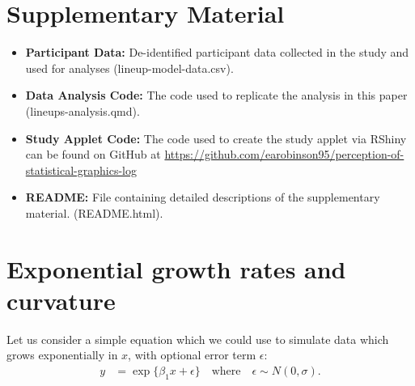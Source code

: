 \documentclass[12pt]{article}
\providecommand{\tightlist}{%
  \setlength{\itemsep}{0pt}\setlength{\parskip}{0pt}}
\begin{document}
\hypertarget{supplementary-material}{%
\section*{Supplementary Material}\label{supplementary-material}}

\begin{itemize}
\tightlist
\item
  \textbf{Participant Data:} De-identified participant data collected in
  the study and used for analyses (lineup-model-data.csv).
\item
  \textbf{Data Analysis Code:} The code used to replicate the analysis
  in this paper (lineups-analysis.qmd).
\item
  \textbf{Study Applet Code:} The code used to create the study applet
  via RShiny can be found on GitHub at
  \url{https://github.com/earobinson95/perception-of-statistical-graphics-log}
\item
  \textbf{README:} File containing detailed descriptions of the
  supplementary material. (README.html).
\end{itemize}

\newpage
{} %

\renewcommand{\thesection}{A}
\setcounter{figure}{0}    
\renewcommand\thefigure{\thesection\arabic{figure}}  
\setcounter{equation}{0}    
\renewcommand\theequation{\thesection\arabic{equation}}

\hypertarget{exponential-growth-rates-and-curvature}{%
\section{Exponential growth rates and
curvature}\label{exponential-growth-rates-and-curvature}}

Let us consider a simple equation which we could use to simulate data
which grows exponentially in \(x\), with optional error term
\(\epsilon\):
\begin{align}y &= \exp\{\beta_1 x + \epsilon\}\quad \text{where}\quad \epsilon \sim N(0, \sigma).\label{eq:simpleexp}\end{align}
\end{document}
